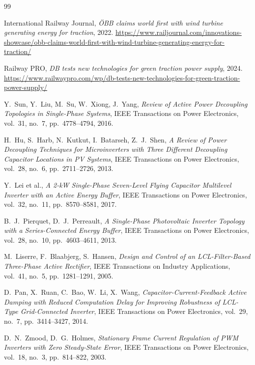 \documentclass[11pt,a4paper]{article}
\begin{document}
\begin{thebibliography}{99}

International Railway Journal, \emph{ÖBB claims world first with wind turbine generating
energy for traction}, 2022.
\url{https://www.railjournal.com/innovations-showcase/obb-claims-world-first-with-wind-turbine-generating-energy-for-traction/}

Railway PRO, \emph{DB tests new technologies for green traction power supply}, 2024.
\url{https://www.railwaypro.com/wp/db-tests-new-technologies-for-green-traction-power-supply/}

Y.~Sun, Y.~Liu, M.~Su, W.~Xiong, J.~Yang,
\emph{Review of Active Power Decoupling Topologies in Single-Phase Systems},
IEEE Transactions on Power Electronics, vol.~31, no.~7, pp.~4778--4794, 2016.

H.~Hu, S.~Harb, N.~Kutkut, I.~Batarseh, Z.~J.~Shen,
\emph{A Review of Power Decoupling Techniques for Microinverters with Three Different
Decoupling Capacitor Locations in PV Systems},
IEEE Transactions on Power Electronics, vol.~28, no.~6, pp.~2711--2726, 2013.

Y.~Lei et al.,
\emph{A 2-kW Single-Phase Seven-Level Flying Capacitor Multilevel Inverter with an Active
Energy Buffer},
IEEE Transactions on Power Electronics, vol.~32, no.~11, pp.~8570--8581, 2017.

B.~J.~Pierquet, D.~J.~Perreault,
\emph{A Single-Phase Photovoltaic Inverter Topology with a Series-Connected Energy
Buffer},
IEEE Transactions on Power Electronics, vol.~28, no.~10, pp.~4603--4611, 2013.

M.~Liserre, F.~Blaabjerg, S.~Hansen,
\emph{Design and Control of an LCL-Filter-Based Three-Phase Active Rectifier},
IEEE Transactions on Industry Applications, vol.~41, no.~5, pp.~1281--1291, 2005.

D.~Pan, X.~Ruan, C.~Bao, W.~Li, X.~Wang,
\emph{Capacitor-Current-Feedback Active Damping with Reduced Computation Delay for
Improving Robustness of LCL-Type Grid-Connected Inverter},
IEEE Transactions on Power Electronics, vol.~29, no.~7, pp.~3414--3427, 2014.

D.~N.~Zmood, D.~G.~Holmes,
\emph{Stationary Frame Current Regulation of PWM Inverters with Zero Steady-State Error},
IEEE Transactions on Power Electronics, vol.~18, no.~3, pp.~814--822, 2003.


\end{thebibliography}
\end{document}
